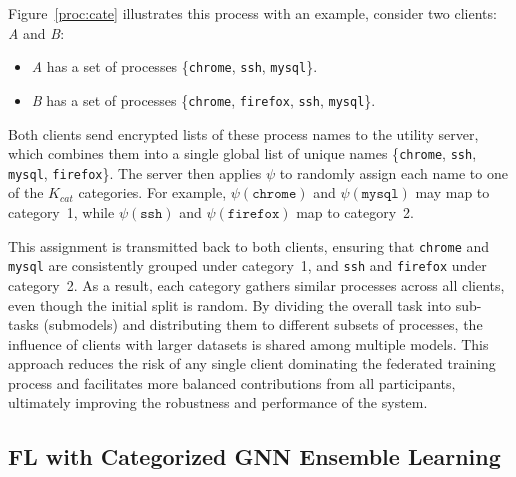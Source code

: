 Figure~\ref{proc:cate} illustrates this process with an example, consider two clients: \emph{A} and \emph{B}:
\begin{itemize}[itemsep=0.1em, parsep=0em, topsep=0em, leftmargin=*]
    \item \emph{A} has a set of processes \{\texttt{chrome}, \texttt{ssh}, \texttt{mysql}\}.
    \item \emph{B} has a set of processes \{\texttt{chrome}, \texttt{firefox}, \texttt{ssh}, \texttt{mysql}\}.
\end{itemize}
Both clients send encrypted lists of these process names to the utility server, which combines them into a single global list of unique names \{\texttt{chrome}, \texttt{ssh}, \texttt{mysql}, \texttt{firefox}\}. The server then applies \( \psi \) to randomly assign each name to one of the \( K_{cat} \) categories. For example, \( \psi(\texttt{chrome}) \) and \( \psi(\texttt{mysql}) \) may map to category~1, while \( \psi(\texttt{ssh}) \) and \( \psi(\texttt{firefox}) \) map to category~2.

This assignment is transmitted back to both clients, ensuring that \texttt{chrome} and \texttt{mysql} are consistently grouped under category~1, and \texttt{ssh} and \texttt{firefox} under category~2. As a result, each category gathers similar processes across all clients, even though the initial split is random. By dividing the overall task into sub-tasks (submodels) and distributing them to different subsets of processes, the influence of clients with larger datasets is shared among multiple models. This approach reduces the risk of any single client dominating the federated training process and facilitates more balanced contributions from all participants, ultimately improving the robustness and performance of the system.

%

\subsection{FL with Categorized GNN Ensemble Learning}
\label{sys:fpgl}




